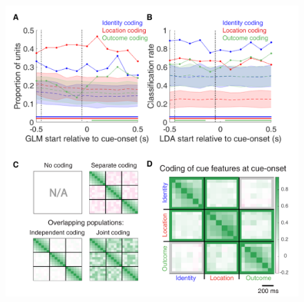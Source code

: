 \documentclass[11pt]{article}
\begin{document}
 \begin{figure}[ht!]
\centering
\includegraphics[height=0.5\textheight]{Fig 4 - Q1.pdf}

\end{figure}
\end{document}
